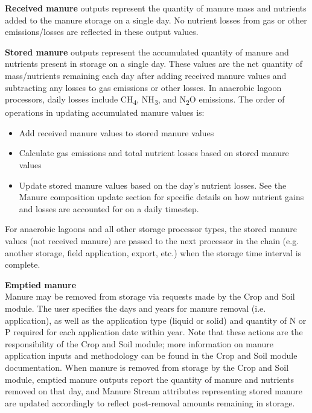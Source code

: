 \begin{refsection}
\textbf{Received manure} outputs represent the quantity of manure mass and nutrients added to the manure storage on a single day. No nutrient losses from gas or other emissions/losses are reflected in these output values. 
    \vspace{0.15cm}

\textbf{Stored manure} outputs represent the accumulated quantity of manure and nutrients present in storage on a single day. These values are the net quantity of mass/nutrients remaining each day after adding received manure values and subtracting any losses to gas emissions or other losses. In anaerobic lagoon processors, daily losses include CH\textsubscript{4}, NH\textsubscript{3}, and N\textsubscript{2}O emissions. The order of operations in updating accumulated manure values is:
        \begin{itemize}
            \item Add received manure values to stored manure values
            \item Calculate gas emissions and total nutrient losses based on stored manure values
            \item Update stored manure values based on the day’s nutrient losses. See the Manure composition update section for specific details on how nutrient gains and losses are accounted for on a daily timestep. 
        \end{itemize}


For anaerobic lagoons and all other storage processor types, the stored manure values (not received manure) are passed to the next processor in the chain (e.g. another storage, field application, export, etc.) when the storage time interval is complete. 
\vspace{0.2cm}

\textbf{Emptied manure}\\
Manure may be removed from storage via requests made by the Crop and Soil module. The user specifies the days and years for manure removal (i.e. application), as well as the application type (liquid or solid) and quantity of N or P required for each application date within year. Note that these actions are the responsibility of the Crop and Soil module; more information on manure application inputs and methodology can be found in the Crop and Soil module documentation. When manure is removed from storage by the Crop and Soil module, emptied manure outputs report the quantity of manure and nutrients removed on that day, and Manure Stream attributes representing stored manure are updated accordingly to reflect post-removal amounts remaining in storage.


\end{refsection}
